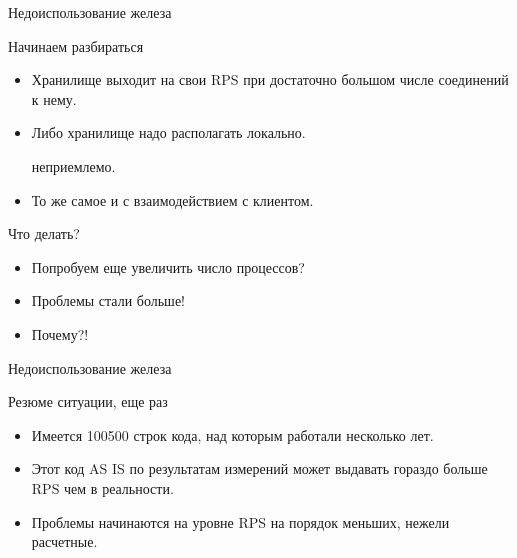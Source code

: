 \documentclass[aspectratio=169]{beamer}
\begin{document}
\begin{frame}{Недоиспользование железа}
    \begin{block}{Начинаем разбираться}
        \begin{itemize}
            \pause\item Хранилище выходит на свои RPS при достаточно большом
                числе соединений к нему.
            \pause\item Либо хранилище надо располагать локально.
                \pause\par {\small неприемлемо.}
            \pause\item То же самое и с взаимодействием с клиентом.
        \end{itemize}
    \end{block}

    \pause
    \begin{block}{Что делать?}
        \begin{itemize}
            \pause\item Попробуем еще увеличить число процессов?
            \pause\item Проблемы стали больше!
            \pause\item Почему?!
        \end{itemize}
    \end{block}
\end{frame}

\begin{frame}{Недоиспользование железа}
    \begin{block}{Резюме ситуации, еще раз}
        \begin{itemize}
            \pause\item Имеется 100500 строк кода,
                над которым работали несколько лет.

            \pause\item Этот код AS IS по результатам измерений
                может выдавать гораздо больше RPS чем в реальности.

            \pause\item Проблемы начинаются на уровне RPS на порядок меньших,
                нежели расчетные.
        \end{itemize}
    \end{block}
\end{frame}
\end{document}
